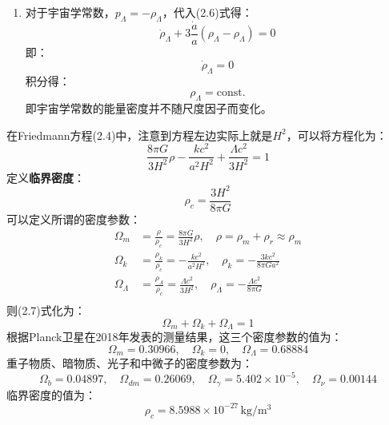 \documentclass[fontset=none,openany,a4paper]{ctexbook}
\begin{document}
\begin{enumerate}
    值得一提的是，宇宙中辐射能量密度的主要贡献（超过$99\%$）是宇宙微波背景辐射（CMB）。CMB光子能量分布在宇宙演化中保持黑体辐射的形式，根据Stefan-Boltzmann定律：
    \begin{equation}
        \rho_r \propto T^4
    \end{equation}
    则宇宙温度（即CMB的温度）和红移的关系为：
    \begin{equation}
        T(z) = T_0(1 + z)
    \end{equation}

    \item 对于宇宙学常数，$p_\Lambda = -\rho_\Lambda$，代入(2.6)式得：
    \begin{equation}
        \dot{\rho}_\Lambda + 3\frac{\dot{a}}{a}\left(\rho_\Lambda - \rho_\Lambda\right) = 0
    \end{equation}
    即：
    \begin{equation}
        \dot{\rho}_\Lambda = 0
    \end{equation}
    积分得：
    \begin{equation}
        \rho_\Lambda = \mathrm{const.}
    \end{equation}
    即宇宙学常数的能量密度并不随尺度因子而变化。
\end{enumerate}

在Friedmann方程(2.4)中，注意到方程左边实际上就是$H^2$，可以将方程化为：
\begin{equation}
    \frac{8\pi G}{3H^2}\rho - \frac{kc^2}{a^2 H^2} + \frac{\Lambda c^2}{3H^2} = 1
\end{equation}
定义\textbf{临界密度}：
\begin{equation}
    \rho_c = \frac{3H^2}{8\pi G}
\end{equation}
可以定义所谓的密度参数：
\begin{align}
    \Omega_m &= \frac{\rho}{\rho_c} = \frac{8\pi G}{3H^2}\rho,\quad \rho = \rho_m + \rho_r \approx \rho_m \\
    \Omega_k &= \frac{\rho_k}{\rho_c} = -\frac{kc^2}{a^2 H^2},\quad \rho_k = -\frac{3kc^2}{8\pi Ga^2} \\
    \Omega_\Lambda &= \frac{\rho_\Lambda}{\rho_c} = \frac{\Lambda c^2}{3H^2},\quad \rho_\Lambda = -\frac{\Lambda c^2}{8\pi G} \\
\end{align}
则(2.7)式化为：
\begin{equation}
    \Omega_m + \Omega_k + \Omega_\Lambda = 1
\end{equation}
根据Planck卫星在2018年发表的测量结果，这三个密度参数的值为：
\begin{equation}
    \Omega_m = 0.30966,\quad \Omega_k = 0,\quad \Omega_\Lambda = 0.68884
\end{equation}
重子物质、暗物质、光子和中微子的密度参数为：
\begin{equation}
    \Omega_b = 0.04897,\quad \Omega_{dm} = 0.26069,\quad \Omega_\gamma = 5.402 \times 10^{-5},\quad \Omega_\nu = 0.00144
\end{equation}
临界密度的值为：
\begin{equation}
    \rho_c = 8.5988 \times 10^{-27}\,\mathrm{kg/m^3}
\end{equation}
\end{document}
